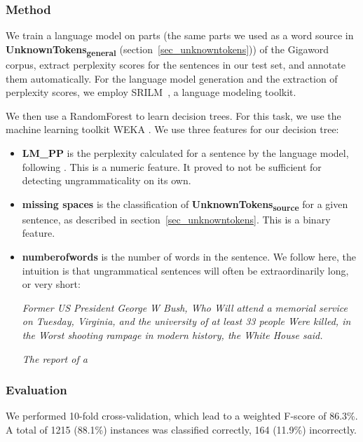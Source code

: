 \documentclass[a4paper,10pt]{scrartcl}
\theoremstyle{style}
\begin{document}
\subsubsection{Method}
We train a language model on parts (the same parts we used as a word source in \textbf{UnknownTokens\textsubscript{general}} (section~\ref{sec_unknowntokens})) of the Gigaword corpus\citep{gigaword}, extract perplexity scores for the sentences in our test set, and annotate them automatically. For the language model generation and the extraction of perplexity scores, we employ SRILM~\citep{stolcke2002srilm}, a language modeling toolkit.


We then use a RandomForest \citep{breiman2001random} to learn decision trees. For this task, we use the machine learning toolkit WEKA \citep{hall2009weka}.
We use three features for our decision tree:

\begin{itemize}
	\item \textbf{LM\_PP} is the perplexity calculated for a sentence by the language model, following \cite{sun2007detecting}. This is a numeric feature. It proved to not be sufficient for detecting ungrammaticality on its own.
	\item \textbf{missing spaces} is the classification of \textbf{UnknownTokens\textsubscript{source}} for a given sentence, as described in section~\ref{sec_unknowntokens}. This is a binary feature.
	\item \textbf{numberofwords} is the number of words in the sentence. We follow \cite{wagner2007comparative} here, the intuition is that ungrammatical sentences will often be extraordinarily long, or very short:

		\textit{Former US President George W Bush, Who Will attend a memorial service on Tuesday, Virginia, and the university of at least 33 people Were killed, in the Worst shooting rampage in modern history, the White House said.}

		\textit{The report of a}
\end{itemize}

\subsubsection{Evaluation}

We performed 10-fold cross-validation, which lead to a weighted F-score of 86.3\%. A total of 1215 (88.1\%) instances was classified correctly, 164 (11.9\%) incorrectly.
\end{document}
